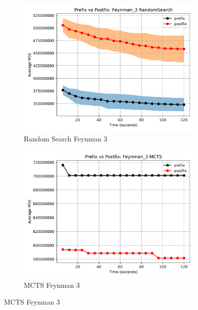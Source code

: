 \documentclass[runningheads]{llncs}
\begin{document}
\begin{figure}
    \centering
    
    \begin{subfigure}[b]{0.4\textwidth}
        \includegraphics[width=\linewidth, keepaspectratio]{AIFeynman_Benchmarks/PrePostFeynman_3RandomSearch.pdf}
        \caption{Random Search Feynman 3}
        \label{subfig:feynman_3_RS}
    \end{subfigure}
    \begin{subfigure}[b]{0.4\textwidth}
        \includegraphics[width=\linewidth, keepaspectratio]{AIFeynman_Benchmarks/PrePostFeynman_3MCTS.pdf}
        \caption{MCTS Feynman 3}
        \label{subfig:feynman_3_MCTS}
    \end{subfigure}
    

\end{figure}
\end{document}
